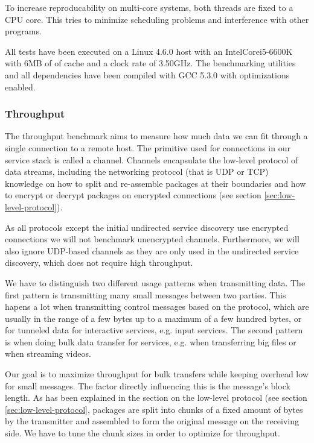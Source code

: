 To increase reproducability on multi-core systems, both threads are fixed to a CPU core.
This tries to minimize scheduling problems and interference with other programs.


\medskip

All tests have been executed on a Linux 4.6.0 host with an Intel\textregistered Core\texttrademark i5-6600K with 6MB of of cache and a clock rate of 3.50GHz.
The benchmarking utilities and all dependencies have been compiled with GCC 5.3.0 with optimizations enabled.

\subsubsection{Throughput}

The throughput benchmark aims to measure how much data we can fit through a single connection to a remote host.
The primitive used for connections in our service stack is called a channel.
Channels encapsulate the low-level protocol of data streams, including the networking protocol (that is UDP or TCP) knowledge on how to split and re-assemble packages at their boundaries and how to encrypt or decrypt packages on encrypted connections (see section \ref{sec:low-level-protocol}).

As all protocols except the initial undirected service discovery use encrypted connections we will not benchmark unencrypted channels.
Furthermore, we will also ignore UDP-based channels as they are only used in the undirected service discovery, which does not require high throughput.

\medskip

We have to distinguish two different usage patterns when transmitting data.
The first pattern is transmitting many small messages between two parties.
This hapens a lot when transmitting control messages based on the protocol, which are usually in the range of a few bytes up to a maximum of a few hundred bytes, or for tunneled data for interactive services, e.g. input services.
The second pattern is when doing bulk data transfer for services, e.g. when transferring big files or when streaming videos.

Our goal is to maximize throughput for bulk transfers while keeping overhead low for small messages.
The factor directly influencing this is the message's block length.
As has been explained in the section on the low-level protocol (see section \ref{sec:low-level-protocol}, packages are split into chunks of a fixed amount of bytes by the transmitter and assembled to form the original message on the receiving side.
We have to tune the chunk sizes in order to optimize for throughput.


